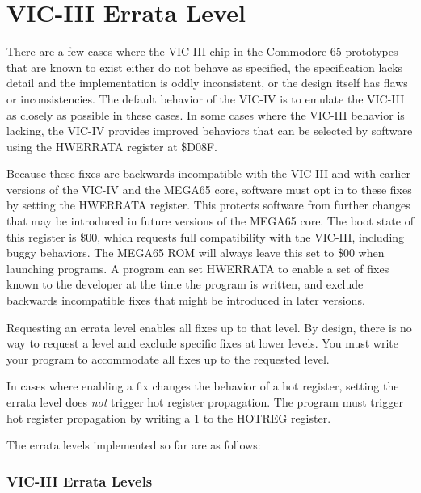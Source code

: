 \section{VIC-III Errata Level}

There are a few cases where the VIC-III chip in the Commodore 65 prototypes that are known to exist either do not behave as specified, the specification lacks detail and the implementation is oddly inconsistent, or the design itself has flaws or inconsistencies. The default behavior of the VIC-IV is to emulate the VIC-III as closely as possible in these cases. In some cases where the VIC-III behavior is lacking, the VIC-IV provides improved behaviors that can be selected by software using the HWERRATA register at \$D08F.

Because these fixes are backwards incompatible with the VIC-III and with earlier versions of the VIC-IV and the MEGA65 core, software must opt in to these fixes by setting the HWERRATA register. This protects software from further changes that may be introduced in future versions of the MEGA65 core. The boot state of this register is \$00, which requests full compatibility with the VIC-III, including buggy behaviors. The MEGA65 ROM will always leave this set to \$00 when launching programs. A program can set HWERRATA to enable a set of fixes known to the developer at the time the program is written, and exclude backwards incompatible fixes that might be introduced in later versions.

Requesting an errata level enables all fixes up to that level. By design, there is no way to request a level and exclude specific fixes at lower levels. You must write your program to accommodate all fixes up to the requested level.

In cases where enabling a fix changes the behavior of a hot register, setting the errata level does {\em{not}} trigger hot register propagation. The program must trigger hot register propagation by writing a 1 to the HOTREG register.

The errata levels implemented so far are as follows:

\subsubsection{VIC-III Errata Levels}

